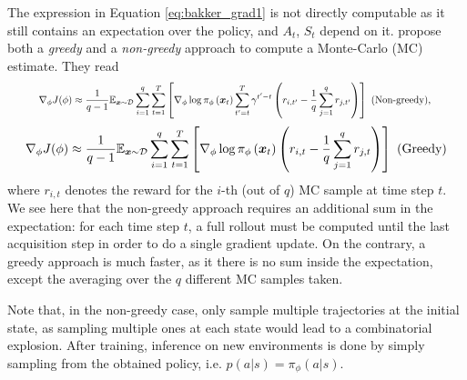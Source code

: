 The expression in Equation \ref{eq:bakker_grad1} is not directly computable as it still contains an expectation over the policy, and $A_t$, $S_t$ depend on it. \citet{bakker2020experimental} propose both a \textit{greedy} and a \textit{non-greedy} approach to compute a Monte-Carlo (MC) estimate. They read
\begin{equation}
    \resizebox*{.9\linewidth}{!}{$\displaystyle
    \nabla_{\phi} J(\phi) \approx \frac{1}{q-1} \mathbb{E}_{\vx \sim \mathcal{D}} \sum_{i=1}^{q} \sum_{t=1}^{T}\left[\nabla_{\phi} \log \pi_{\phi}\left(\vx_{t}\right) \sum_{t^{\prime}=t}^{T} \gamma^{t^{\prime}-t}\left(r_{i, t^{\prime}}-\frac{1}{q} \sum_{j=1}^{q} r_{j, t^{\prime}}\right)\right] \text { (Non-greedy), }$}
\end{equation}
\begin{equation}
    \nabla_{\phi} J(\phi) \approx \frac{1}{q-1} \mathbb{E}_{\boldsymbol{x} \sim \mathcal{D}} \sum_{i=1}^{q} \sum_{t=1}^{T}\left[\nabla_{\phi} \log \pi_{\phi}\left({\bm{x}}_{t}\right)\left(r_{i, t}-\frac{1}{q} \sum_{j=1}^{q} r_{j, t}\right)\right] \text { (Greedy)}
\end{equation}
where $r_{i,t}$ denotes the reward for the $i$-th (out of $q$) MC sample at time step $t$. We see here that the non-greedy approach requires an additional sum in the expectation: for each time step $t$, a full rollout must be computed until the last acquisition step in order to do a single gradient update. On the contrary, a greedy approach is much faster, as it there is no sum inside the expectation, except the averaging over the $q$ different MC samples taken.

Note that, in the non-greedy case, \citet{bakker2020experimental} only sample multiple trajectories at the initial state, as sampling multiple ones at each state would lead to a combinatorial explosion. After training, inference on new environments is done by simply sampling from the obtained policy, i.e. $p(a|s) = \pi_\phi(a|s)$.


